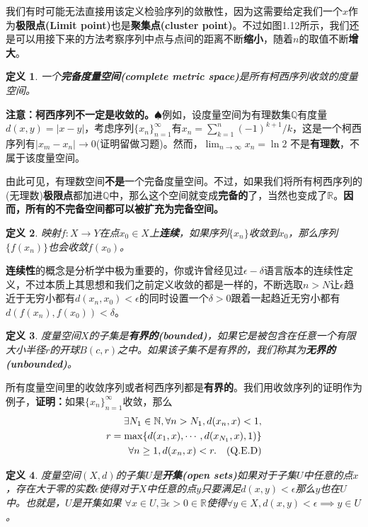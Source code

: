 \documentclass[mathserif,hyperref,UTF8,openany,b5paper]{ctexbook}
\newtheorem{defn}{定义}[section]
\begin{document}
我们有时可能无法直接用该定义检验序列的敛散性，因为这需要给定我们一个$x$作为\textbf{极限点(Limit point)}也是\textbf{聚集点(cluster point)}。不过如图1.12所示，我们还是可以用接下来的方法考察序列中点与点间的距离不断\textbf{缩小}，随着$n$的取值不断\textbf{增大}。

\begin{defn}
一个\textbf{完备度量空间(complete metric space)}是所有柯西序列收敛的度量空间。
\end{defn}

\textbf{注意：柯西序列不一定是收敛的。}$\spadesuit$例如，设度量空间为有理数集$\mathbb{Q}$有度量$d(x,y)=|x-y|$，考虑序列$\{x_n\}_{n=1}^\infty$有$x_n=\sum^{n}_{k=1} (-1)^{k+1}/k$，这是一个柯西序列有$|x_m-x_n|\xrightarrow{} 0$(证明留做习题)。然而，$\lim_{n \xrightarrow{}\infty} x_n = \ln 2$ 不是\textbf{有理数}，不属于该度量空间。

由此可见，有理数空间\textbf{不是}一个完备度量空间。不过，如果我们将所有柯西序列的(无理数)\textbf{极限点}都加进$\mathbb{Q}$中，那么这个空间就变成\textbf{完备的}了，当然也变成了$\mathbb{R}$。\textbf{因而，所有的不完备空间都可以被扩充为完备空间。}

\begin{defn}
映射$f:X \xrightarrow{} Y$在点$x_0 \in X$上\textbf{连续}，如果序列$\{x_n\}$收敛到$x_0$，那么序列$\{f(x_n)\}$也会收敛$f(x_0)$。
\end{defn}

\textbf{连续性}的概念是分析学中极为重要的，你或许曾经见过$\epsilon - \delta$语言版本的连续性定义，不过本质上其思想和我们之前定义收敛的都是一样的，不断选取$n>N$让$\epsilon$趋近于无穷小都有$d(x_n,x_0)<\epsilon$的同时设置一个$\delta > 0$跟着一起趋近无穷小都有$d(f(x_n),f(x_0))<\delta$。
\begin{defn}
度量空间$X$的子集是\textbf{有界的(bounded)}，如果它是被包含在任意一个有限大小半径$r$的开球$B(c,r)$之中。如果该子集不是有界的，我们称其为\textbf{无界的(unbounded)}。
\end{defn}

所有度量空间里的收敛序列或者柯西序列都是\textbf{有界的}。我们用收敛序列的证明作为例子，\textbf{证明：}如果$\{x_n\}_{n=1}^\infty$收敛，那么 
\begin{align}
\exists N_1\in \mathbb{N}, \forall n > N_1,d(x_n,x)<1,\\
r = \max\{d(x_1,x),\cdots,d(x_{N_1},x),1)\} \\
\forall n \geq 1, d(x_n,x)<r . \quad \rm (Q.E.D)
\end{align}
\begin{defn}
度量空间$(X,d)$的子集$U$是\textbf{开集(open sets)}如果对于子集$U$中任意的点$x$，存在大于零的实数$\epsilon$使得对于$X$中任意的点$y$只要满足$d(x,y)<\epsilon$那么$y$也在$U$中。也就是，$U$是开集如果
$\forall x \in U, \exists \epsilon > 0\in \mathbb{R}$使得$\forall y \in X, d(x,y)<\epsilon \implies y\in U$。
\end{defn}
\end{document}

